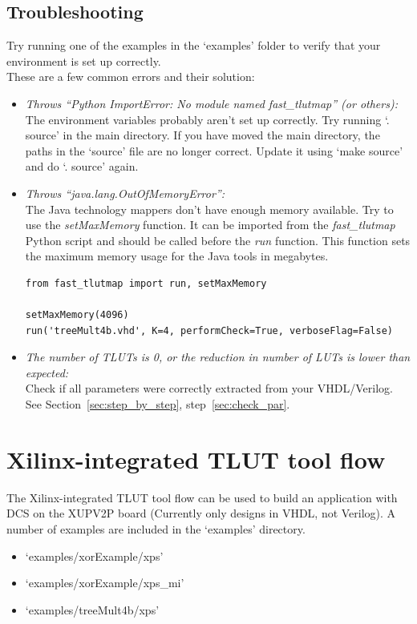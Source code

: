 \documentclass[a4paper,oneside]{memoir}
\begin{document}
\section{Troubleshooting}\label{sec:tlut_troubleshooting}
Try running one of the examples in the `examples' folder to verify that your environment is set up correctly.\\

These are a few common errors and their solution:
\begin{itemize}
\item \emph{Throws ``Python ImportError: No module named fast\_tlutmap'' (or others):}\\
The environment variables probably aren't set up correctly. Try running `. source' in the main directory. 
If you have moved the main directory, the paths in the `source' file are no longer correct. Update it using `make source' and do `. source' again.

\item \emph{Throws ``java.lang.OutOfMemoryError'':}\\
The Java technology mappers don't have enough memory available. Try to use the \emph{setMaxMemory} function. It can be imported from the \emph{fast\_tlutmap} Python script and should be called before the \emph{run} function. This function sets the maximum memory usage for the Java tools in megabytes.
\lstset{language=python}
\begin{lstlisting}
from fast_tlutmap import run, setMaxMemory

setMaxMemory(4096)
run('treeMult4b.vhd', K=4, performCheck=True, verboseFlag=False)
\end{lstlisting}

\item \emph{The number of TLUTs is 0, or the reduction in number of LUTs is lower than expected:}\\
Check if all parameters were correctly extracted from your VHDL/Verilog. See Section~\ref{sec:step_by_step}, step~\ref{sec:check_par}.
\end{itemize}


\clearpage
\chapter{Xilinx-integrated TLUT tool flow}\label{sec:xilinx_flow}
The Xilinx-integrated TLUT tool flow can be used to build an application with DCS on the XUPV2P board (Currently only designs in VHDL, not Verilog).
A number of examples are included in the `examples' directory.
\begin{itemize}
\item `examples/xorExample/xps'
\item `examples/xorExample/xps\_mi'
\item `examples/treeMult4b/xps'
\end{itemize}
\end{document}
